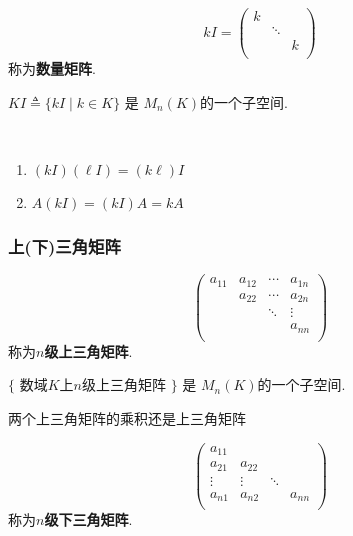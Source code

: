 \begin{Definition}[数量矩阵]
\[
kI = \begin{pmatrix}
k &   &    \\
    & \ddots & \\
    &        &k \\
\end{pmatrix} 
\]
称为\textbf{数量矩阵}.
\end{Definition}

\begin{Note}
$ KI \triangleq \{ kI \mid k \in K \} $ 是 $M_n(K)$的一个子空间. 
\end{Note}

\begin{Note} \ \\
\begin{enumerate}[(1)]
\item $ (kI) (\ell I) = (k\ell) I $
\item $A(kI) = (kI)A = kA$
\end{enumerate}
\end{Note}

\subsubsection{上(下)三角矩阵}

\begin{Definition}[上三角矩阵]
\[
\begin{pmatrix}
a_{11} & a_{12} & \cdots & a_{1n} \\
       & a_{22} & \cdots & a_{2n} \\
       &        & \ddots & \vdots \\
       &        &        & a_{nn} \\
\end{pmatrix}
\]
称为\textbf{$n$级上三角矩阵}.

\end{Definition}

\begin{Note}
$\{$ 数域$K$上$n$级上三角矩阵 $\}$ 是 $M_n(K)$的一个子空间. 
\end{Note}

\begin{Note}
两个上三角矩阵的乘积还是上三角矩阵
\end{Note}

\begin{Definition}[下三角矩阵]
\[
\begin{pmatrix}
a_{11} &        &        &        \\
a_{21} & a_{22} &        & \\
\vdots & \vdots & \ddots &  \\
a_{n1} & a_{n2} &        & a_{nn} \\
\end{pmatrix}
\]
称为\textbf{$n$级下三角矩阵}.
\end{Definition}

